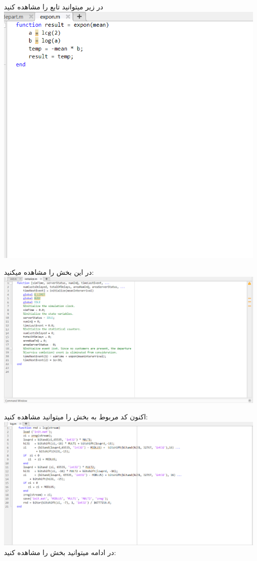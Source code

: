 \documentclass[12pt,a4paper]{report}
\begin{document}
	در زیر میتوانید تابع 
	را مشاهده کنید\\
	
	\includegraphics[scale=0.6]{Figures/E}
	
	\pagebreak
	
	در این بخش  
	را مشاهده میکنید:\\
	
	\includegraphics[scale=0.6]{Figures/I}
	
	
	اکنون کد مربوط به بخش
	را میتوانید مشاهده کنید:\\
	
	\includegraphics[scale=0.6]{Figures/L}
	\pagebreak
	در ادامه میتوانید بخش 
	را مشاهده کنید:
	
\end{document}
